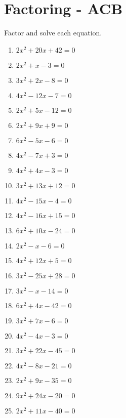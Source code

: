 \section{Factoring - ACB}
Factor and solve each equation. \\
\begin{enumerate}
\item $2x^{2} + 20x + 42 = 0$
\item $2x^{2} + x - 3 = 0$
\item $3x^{2} + 2x - 8 = 0$
\item $4x^{2} - 12x - 7 = 0$
\item $2x^{2} + 5x - 12 = 0$
\item $2x^{2} + 9x + 9 = 0$
\item $6x^{2} - 5x - 6 = 0$
\item $4x^{2} - 7x + 3 = 0$
\item $4x^{2} + 4x - 3 = 0$
\item $3x^{2} + 13x + 12 = 0$
\item $4x^{2} - 15x - 4 = 0$
\item $4x^{2} - 16x + 15 = 0$
\item $6x^{2} + 10x - 24 = 0$
\item $2x^{2} - x - 6 = 0$
\item $4x^{2} + 12x + 5 = 0$
\item $3x^{2} - 25x + 28 = 0$
\item $3x^{2} - x - 14 = 0$
\item $6x^{2} + 4x - 42 = 0$
\item $3x^{2} + 7x - 6 = 0$
\item $4x^{2} - 4x - 3 = 0$
\item $3x^{2} + 22x - 45 = 0$
\item $4x^{2} - 8x - 21 = 0$
\item $2x^{2} + 9x - 35 =0$
\item $9x^{2} + 24x - 20 = 0$
\item $2x^{2} + 11x - 40 = 0$
\end{enumerate}
